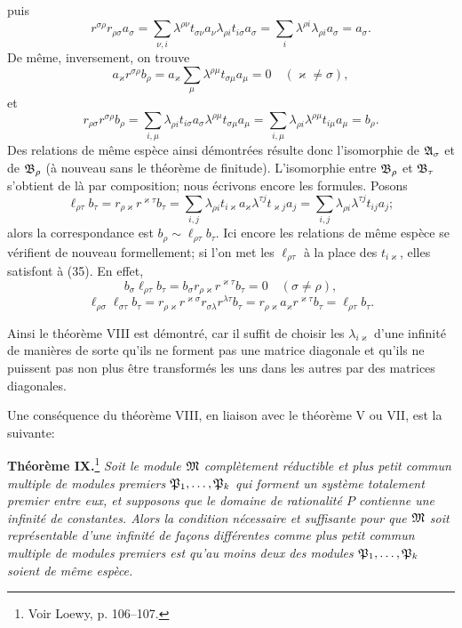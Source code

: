 puis
\[
 r^{\sigma\rho}r_{\rho\sigma}a_\sigma
 =\sum_{\nu,i}\lambda^{\rho\nu}t_{\sigma\nu}a_\nu\lambda_{\rho i}t_{i\sigma}a_\sigma
 =\sum_i\lambda^{\rho i}\lambda_{\rho i}a_\sigma=a_\sigma.
\]
De même, inversement, on trouve
\[
 a_\varkappa r^{\sigma\rho}b_\rho
 =a_\varkappa\sum_\mu\lambda^{\rho\mu}t_{\sigma\mu}a_\mu=0
 \quad(\varkappa\ne\sigma),
\]
et
\[
 r_{\rho\sigma}r^{\sigma\rho}b_\rho
 =\sum_{i,\mu}\lambda_{\rho i}t_{i\sigma}a_\sigma\lambda^{\rho\mu}t_{\sigma\mu}a_\mu
 =\sum_{i,\mu}\lambda_{\rho i}\lambda^{\rho\mu}t_{i\mu}a_\mu=b_\rho.
\]
Des relations de même espèce ainsi démontrées résulte donc l'isomorphie de $\mathfrak{A}_\sigma$ et de $\mathfrak{B}_\rho$ (à nouveau sans le théorème de finitude). L'isomorphie entre $\mathfrak{B}_\rho$ et $\mathfrak{B}_\tau$ s'obtient de là par composition; nous écrivons encore les formules. Posons
\[
 \ell_{\rho\tau}b_\tau=r_{\rho\varkappa}r^{\varkappa\tau}b_\tau
 =\sum_{i,j}\lambda_{\rho i}t_{i\varkappa}a_\varkappa\lambda^{\tau j}t_{\varkappa j}a_j
 =\sum_{i,j}\lambda_{\rho i}\lambda^{\tau j}t_{ij}a_j;
\]
alors la correspondance est $b_\rho\sim\ell_{\rho\tau}b_\tau$. Ici encore les relations de même espèce se vérifient de nouveau formellement; si l'on met les $\ell_{\rho\tau}$ à la place des $t_{i\varkappa}$, elles satisfont à (35). En effet,
\[
 b_\sigma\ell_{\rho\tau}b_\tau=b_\sigma r_{\rho\varkappa}r^{\varkappa\tau}b_\tau=0\quad(\sigma\ne\rho),
\]
\[
 \ell_{\rho\sigma}\ell_{\sigma\tau}b_\tau=r_{\rho\varkappa}r^{\varkappa\sigma}r_{\sigma\lambda}r^{\lambda\tau}b_\tau
 =r_{\rho\varkappa}a_\varkappa r^{\varkappa\tau}b_\tau=\ell_{\rho\tau}b_\tau.
\]

Ainsi le théorème VIII est démontré, car il suffit de choisir les $\lambda_{i\varkappa}$ d'une infinité de manières de sorte qu'ils ne forment pas une matrice diagonale et qu'ils ne puissent pas non plus être transformés les uns dans les autres par des matrices diagonales.

Une conséquence du théorème VIII, en liaison avec le théorème V ou VII, est la suivante:

\textbf{Théorème IX.}\footnote{Voir Loewy, p. 106--107.} \emph{Soit le module $\mathfrak{M}$ complètement réductible et plus petit commun multiple de modules premiers $\mathfrak P_1,\ldots,\mathfrak P_k$ qui forment un système totalement premier entre eux, et supposons que le domaine de rationalité $P$ contienne une infinité de constantes. Alors la condition nécessaire et suffisante pour que $\mathfrak{M}$ soit représentable d'une infinité de façons différentes comme plus petit commun multiple de modules premiers est qu'au moins deux des modules $\mathfrak P_1,\ldots,\mathfrak P_k$ soient de même espèce.}

